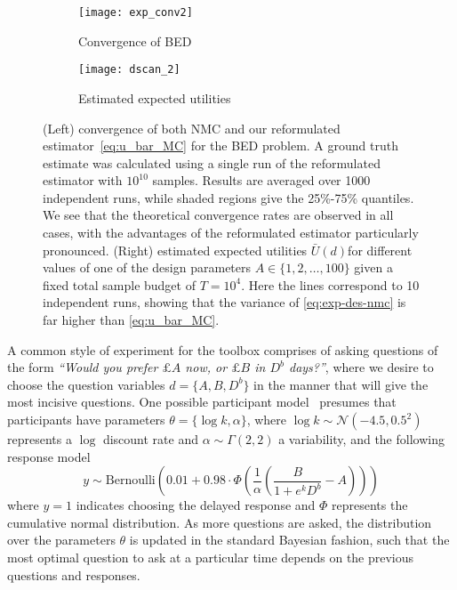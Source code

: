 \begin{figure}[t]
	\centering
	\begin{subfigure}[b]{0.49\textwidth}
		\centering
		\texttt{[image: exp\_conv2]}
		\caption{Convergence of BED\label{fig:exp-conv}}
	\end{subfigure}
		\begin{subfigure}[b]{0.49\textwidth}
			\centering
			\texttt{[image: dscan\_2]}
			\caption{Estimated expected utilities \label{fig:exp-d-scan}}
		\end{subfigure}
	\caption{(Left) convergence of both NMC and our reformulated
		estimator~\eqref{eq:u_bar_MC} for the BED problem.
		A ground truth estimate was calculated using a single run of the reformulated
		estimator with $10^{10}$ samples.
		Results are averaged over 1000 independent runs, while shaded regions give the 25\%-75\% quantiles. We
		see that the theoretical convergence rates are observed in all cases,
		with the advantages of the reformulated estimator particularly pronounced.
		(Right) estimated expected utilities $\bar{U}(d)$for 
		different values of one of the design parameters $A \in \{1,2,\dots,100\}$ given a fixed total
		sample budget of $T=10^4$.  Here the lines correspond to 10 independent runs, showing
		that the variance of \eqref{eq:exp-des-nmc} is far higher than \eqref{eq:u_bar_MC}.
		}
\end{figure}

A common style of experiment for the toolbox comprises of asking questions of the form 
\emph{``Would you prefer $\pounds A$ now, or $\pounds B$ in $D^b$ days?''}, where we desire
to choose the question  variables $d = \{A,B,D^b\}$ in the manner that will give the most 
incisive questions.  One possible participant model~\citep{vincent2016hierarchical}
presumes that participants have parameters $\theta=\{\log k,\alpha\}$, where $\log k \sim \mathcal{N}(-4.5,0.5^2)$ 
represents a $\log$ discount rate and $\alpha\sim \Gamma(2,2)$ a variability, and the following response model
\begin{equation}
\label{eq:design:darc}
y \sim \mathrm{Bernoulli} \left(0.01 + 0.98 \cdot \Phi\left(\frac{1}{\alpha} \left(\frac{B}{1+e^k D^b}-A\right)\right)\right)
\end{equation}
where $y=1$ indicates choosing the delayed response and $\Phi$ represents the 
cumulative normal distribution. As more questions are asked, the distribution 
over the parameters $\theta$ is updated in the standard Bayesian fashion, such
that the most optimal question to ask at a particular time depends on the previous questions
and responses.  

